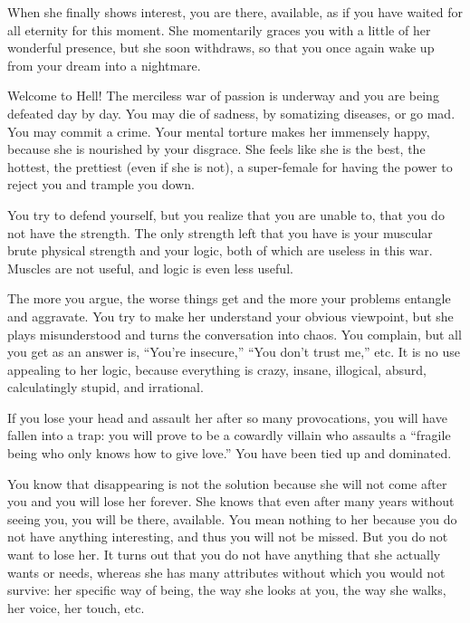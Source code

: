 \par When she finally shows interest, you are there, available, as if you have waited for all eternity for this moment. She momentarily graces you with a little of her wonderful presence, but she soon withdraws, so that you once again wake up from your dream into a nightmare.

\par Welcome to Hell! The merciless war of passion is underway and you are being defeated day by day. You may die of sadness, by somatizing diseases, or go mad. You may commit a crime. Your mental torture makes her immensely happy, because she is nourished by your disgrace. She feels like she is the best, the hottest, the prettiest (even if she is not), a super-female for having the power to reject you and trample you down.

\par You try to defend yourself, but you realize that you are unable to, that you do not have the strength. The only strength left that you have is your muscular brute physical strength and your logic, both of which are useless in this war. Muscles are not useful, and logic is even less useful.

\par The more you argue, the worse things get and the more your problems entangle and aggravate. You try to make her understand your obvious viewpoint, but she plays misunderstood and turns the conversation into chaos. You complain, but all you get as an answer is, \enquote{You're insecure,} \enquote{You don't trust me,} etc. It is no use appealing to her logic, because everything is crazy, insane, illogical, absurd, calculatingly stupid, and irrational.

\par If you lose your head and assault her after so many provocations, you will have fallen into a trap: you will prove to be a cowardly villain who assaults a \enquote{fragile being who only knows how to give love.} You have been tied up and dominated.

\par You know that disappearing is not the solution because she will not come after you and you will lose her forever. She knows that even after many years without seeing you, you will be there, available. You mean nothing to her because you do not have anything interesting, and thus you will not be missed. But you do not want to lose her. It turns out that you do not have anything that she actually wants or needs, whereas she has many attributes without which you would not survive: her specific way of being, the way she looks at you, the way she walks, her voice, her touch, etc.

